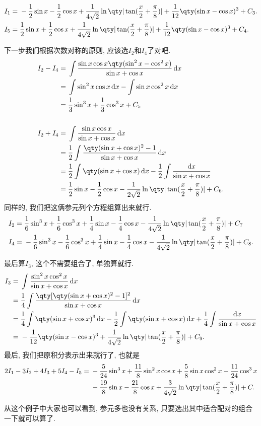 \documentclass{ctexbook}
\newcommand*{\dif}{\mathop{}\!\mathrm{d}}
\begin{document}
{\begin{align*}
I_{1}={}&-\frac{1}{2}\sin{x}-\frac{1}{2}\cos{x}+\frac{1}{4\sqrt{2}}\ln\qty|\tan(\frac{x}{2}+\frac{\pi}{8})|+\frac{1}{12}\qty(\sin{x}-\cos{x})^{3}+C_{3}.\\
I_{5}={}&\frac{1}{2}\sin{x}+\frac{1}{2}\cos{x}+\frac{1}{4\sqrt{2}}\ln\qty|\tan(\frac{x}{2}+\frac{\pi}{8})|+\frac{1}{12}\qty(\sin{x}-\cos{x})^{3}+C_{4}
.\end{align*}\par
下一步我们根据次数对称的原则, 应该选$I_{2}$和$I_{4}$了对吧. 
\begin{align*}
I_{2}-I_{4}={}&\int\frac{\sin{x}\cos{x}\qty(\sin^{2}{x}-\cos^{2}{x})}{\sin{x}+\cos{x}}\dif{x}\\
={}&\int\sin^{2}{x}\cos{x}\dif{x}-\int\sin{x}\cos^{2}{x}\dif{x}\\
={}&\frac{1}{3}\sin^{3}{x}+\frac{1}{3}\cos^{3}{x}+C_{5}\\
\\
I_{2}+I_{4}={}&\int\frac{\sin{x}\cos{x}}{\sin{x}+\cos{x}}\dif{x}\\
={}&\frac{1}{2}\int\frac{\qty(\sin{x}+\cos{x})^{2}-1}{\sin{x}+\cos{x}}\dif{x}\\
={}&\frac{1}{2}\int\qty(\sin{x}+\cos{x})\dif{x}-\frac{1}{2}\int\frac{\dif{x}}{\sin{x}+\cos{x}}\\
={}&\frac{1}{2}\sin{x}-\frac{1}{2}\cos{x}-\frac{1}{2\sqrt{2}}\ln\qty|\tan(\frac{x}{2}+\frac{\pi}{8})|+C_{6}
.\end{align*}
同样的, 我们把这俩参元列个方程组算出来就行. 
\begin{align*}
I_{2}={}&\frac{1}{6}\sin^{3}{x}+\frac{1}{6}\cos^{3}{x}+\frac{1}{4}\sin{x}-\frac{1}{4}\cos{x}-\frac{1}{4\sqrt{2}}\ln\qty|\tan(\frac{x}{2}+\frac{\pi}{8})|+C_{7}\\
I_{4}={}&-\frac{1}{6}\sin^{3}{x}-\frac{1}{6}\cos^{3}{x}+\frac{1}{4}\sin{x}-\frac{1}{4}\cos{x}-\frac{1}{4\sqrt{2}}\ln\qty|\tan(\frac{x}{2}+\frac{\pi}{8})|+C_{8}
.\end{align*}\par
最后算$I_{3}$, 这个不需要组合了, 单独算就行. 
\begin{align*}
I_{3}={}&\int\frac{\sin^{2}{x}\cos^{2}{x}}{\sin{x}+\cos{x}}\dif{x}\\
={}&\frac{1}{4}\int\frac{\qty[\qty(\sin{x}+\cos{x})^{2}-1]^{2}}{\sin{x}+\cos{x}}\dif{x}\\
={}&\frac{1}{4}\int\qty(\sin{x}+\cos{x})^{3}\dif{x}-\frac{1}{2}\int\qty(\sin{x}+\cos{x})\dif{x}+\frac{1}{4}\int\frac{\dif{x}}{\sin{x}+\cos{x}}\\
={}&-\frac{1}{12}\qty(\sin{x}-\cos{x})^{3}+\frac{1}{4\sqrt{2}}\ln\qty|\tan(\frac{x}{2}+\frac{\pi}{8})|+C_{9}
.\end{align*}
最后, 我们把原积分表示出来就行了, 也就是
\begin{align*}
2I_{1}-3I_{2}+4I_{3}+5I_{4}-I_{5}={}&-\frac{5}{24}\sin^{3}{x}+\frac{11}{8}\sin^{2}{x}\cos{x}+\frac{5}{8}\sin{x}\cos^{2}{x}-\frac{11}{24}\cos^{3}{x}\\
{}&-\frac{19}{8}\sin{x}-\frac{21}{8}\cos{x}+\frac{3}{4\sqrt{2}}\ln\qty|\tan(\frac{x}{2}+\frac{\pi}{8})|+C
.\end{align*}\par
从这个例子中大家也可以看到, 参元多也没有关系, 只要选出其中适合配对的组合一下就可以算了. \par
}
\end{document}
